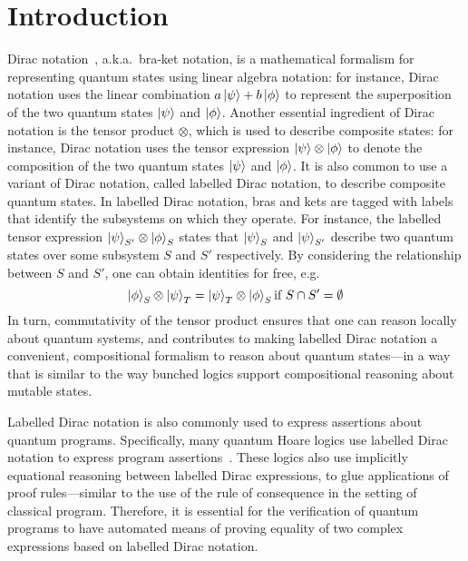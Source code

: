 
\section{Introduction}


Dirac notation~\cite{dirac1939new}, a.k.a.\, bra-ket notation, is a
mathematical formalism for representing quantum states using linear
algebra notation: for instance, Dirac notation uses the linear
combination \( a\ket{\psi} + b\ket{\phi} \) to represent the
superposition of the two quantum states \( \ket{\psi} \) and
\( \ket{\phi} \). Another essential ingredient of Dirac notation
is the tensor product $\otimes$, which is used to describe composite
states: for instance, Dirac notation uses the tensor expression
\( \ket{\psi} \otimes \ket{\phi} \) to denote the composition of
the two quantum states \( \ket{\psi} \) and \( \ket{\phi} \). It is
also common to use a variant of Dirac notation, called labelled Dirac
notation, to describe composite quantum states. In labelled Dirac
notation, bras and kets are tagged with labels that identify the
subsystems on which they operate. For instance, the labelled tensor
expression
\( \ket{\psi}_{S'} \otimes \ket{\phi}_{S} \)
states that $\ket{\psi}_S$ and $\ket{\psi}_{S'}$ describe two quantum
states over some subsystem $S$ and $S'$ respectively. By considering
the relationship between $S$ and $S'$, one can obtain identities for
free, e.g.\, 
%
$$\ket{\phi}_S \otimes \ket{\psi}_{T} = \ket{\psi}_{T} \otimes \ket{\phi}_S
\mbox{if}~S\cap S'=\emptyset$$
%
In turn, commutativity of the tensor product ensures that one can
reason locally about quantum systems, and contributes to making
labelled Dirac notation a convenient, compositional formalism to
reason about quantum states---in a way that is similar to the way
bunched logics support compositional reasoning about mutable states.

Labelled Dirac notation is also commonly used to express assertions
about quantum programs. Specifically, many quantum Hoare logics use
labelled Dirac notation to express program assertions~\cite{DBLP:conf/lics/ZhouBHYY21,Zhou2023}. These logics also use
implicitly equational reasoning between labelled Dirac expressions, to
glue applications of proof rules---similar to the use of the rule of
consequence in the setting of classical program. Therefore, it is
essential for the verification of quantum programs to have automated
means of proving equality of two complex expressions based on labelled
Dirac notation.


